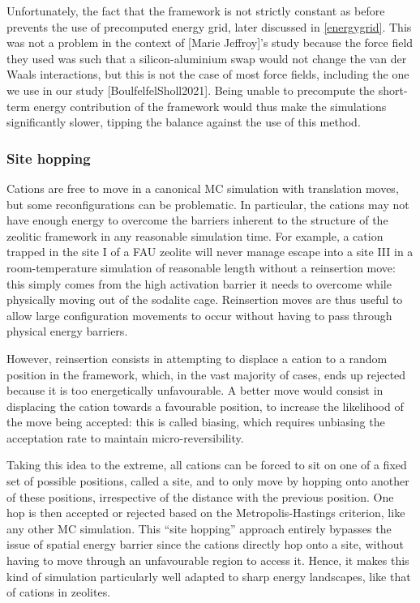 \documentclass[main.tex]{subfiles}
\begin{document}
Unfortunately, the fact that the framework is not strictly constant as before prevents the use of precomputed energy grid, later discussed in \cref{energygrid}. This was not a problem in the context of [Marie Jeffroy]'s study because the force field they used was such that a silicon-aluminium swap would not change the van der Waals interactions, but this is not the case of most force fields, including the one we use in our study [BoulfelfelSholl2021]. Being unable to precompute the short-term energy contribution of the framework would thus make the simulations significantly slower, tipping the balance against the use of this method.

\subsubsection{Site hopping}

\label{sitehopping}

Cations are free to move in a canonical MC simulation with translation moves, but some reconfigurations can be problematic. In particular, the cations may not have enough energy to overcome the barriers inherent to the structure of the zeolitic framework in any reasonable simulation time. For example, a cation trapped in the site I of a FAU zeolite will never manage escape into a site III in a room-temperature simulation of reasonable length without a reinsertion move: this simply comes from the high activation barrier it needs to overcome while physically moving out of the sodalite cage. Reinsertion moves are thus useful to allow large configuration movements to occur without having to pass through physical energy barriers.

However, reinsertion consists in attempting to displace a cation to a random position in the framework, which, in the vast majority of cases, ends up rejected because it is too energetically unfavourable. A better move would consist in displacing the cation towards a favourable position, to increase the likelihood of the move being accepted: this is called biasing, which requires unbiasing the acceptation rate to maintain micro-reversibility.

Taking this idea to the extreme, all cations can be forced to sit on one of a fixed set of possible positions, called a site, and to only move by hopping onto another of these positions, irrespective of the distance with the previous position. One hop is then accepted or rejected based on the Metropolis-Hastings criterion, like any other MC simulation. This ``site hopping'' approach entirely bypasses the issue of spatial energy barrier since the cations directly hop onto a site, without having to move through an unfavourable region to access it. Hence, it makes this kind of simulation particularly well adapted to sharp energy landscapes, like that of cations in zeolites.
\end{document}
